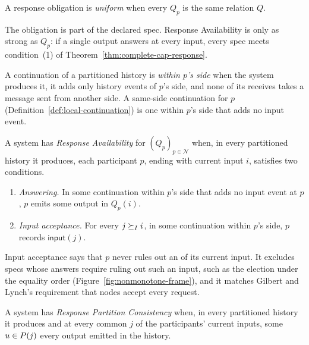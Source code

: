 \begin{definition}
\label{def:uniform-obligation}
A response obligation is \emph{uniform} when every $Q_p$ is the same
relation $Q$.
\end{definition}

The obligation is part of the declared spec.  Response Availability is only
as strong as $Q_p$: if a single output answers at every input, every spec
meets condition~(1) of Theorem~\ref{thm:complete-cap-response}.

A continuation of a partitioned history is \emph{within $p$'s side} when
the system produces it, it adds only history events of $p$'s side, and none of its
receives takes a message sent from another side.  A same-side continuation
for $p$ (Definition~\ref{def:local-continuation}) is one within $p$'s side
that adds no input event.

\begin{definition}
\label{def:response-availability}
A system has \emph{Response Availability} for $(Q_p)_{p\in\mathcal N}$ when, in every
partitioned history it produces, each participant $p$, ending with current
input $i$, satisfies two conditions.
\begin{enumerate}
  \item \emph{Answering.}  In some continuation within $p$'s side that
        adds no input event at $p$, $p$ emits some output in $Q_p(i)$.
  \item \emph{Input acceptance.}  For every $j\succeq_I i$, in some
        continuation within $p$'s side, $p$ records $\mathsf{input}(j)$.
\end{enumerate}
\end{definition}

Input acceptance says that $p$ never rules out an \indesc of its current
input.  It excludes specs whose answers require ruling out such an input, such
as the election under the equality order (Figure~\ref{fig:nonmonotone-frame}),
and it matches Gilbert and Lynch's requirement that nodes accept every
request.

\begin{definition}
\label{def:response-partition-consistency}
A system has \emph{Response Partition Consistency} when, in every partitioned
history it produces and at every common \indesc $j$ of the participants'
current inputs, some $u\in P(j)$ \outrel every output emitted in the
history.
\end{definition}

